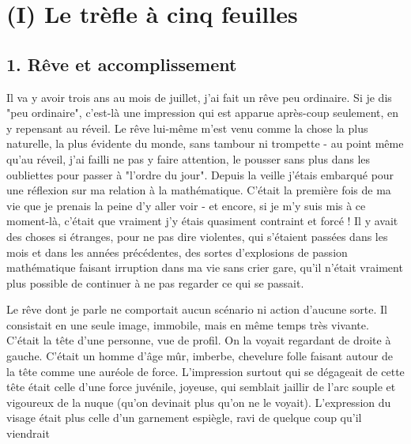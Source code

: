 \section{(I) Le trèfle à cinq feuilles}

\subsection*{1. Rêve et accomplissement}

Il va y avoir trois ans au mois de juillet, j'ai fait un rêve peu ordinaire. Si je dis "peu ordinaire", c'est-là une impression qui est apparue après-coup seulement, en y repensant au réveil. Le rêve lui-même m'est venu comme la chose la plus naturelle, la plus évidente du monde, sans tambour ni trompette - au point même qu'au réveil, j'ai failli ne pas y faire attention, le pousser sans plus dans les oubliettes pour passer à "l'ordre du jour". Depuis la veille j'étais embarqué pour une réflexion sur ma relation à la mathématique. C'était la première fois de ma vie que je prenais la peine d'y aller voir - et encore, si je m'y suis mis à ce moment-là, c'était que vraiment j'y étais quasiment contraint et forcé ! Il y avait des choses si étranges, pour ne pas dire violentes, qui s'étaient passées dans les mois et dans les années précédentes, des sortes d'explosions de passion mathématique faisant irruption dans ma vie sans crier gare, qu'il n'était vraiment plus possible de continuer à ne pas regarder ce qui se passait.

Le rêve dont je parle ne comportait aucun scénario ni action d'aucune sorte. Il consistait en une seule image, immobile, mais en même temps très vivante. C'était la tête d'une personne, vue de profil. On la voyait regardant de droite à gauche. C'était un homme d'âge mûr, imberbe, chevelure folle faisant autour de la tête comme une auréole de force. L'impression surtout qui se dégageait de cette tête était celle d'une force juvénile, joyeuse, qui semblait jaillir de l'arc souple et vigoureux de la nuque (qu'on devinait plus qu'on ne le voyait). L'expression du visage était plus celle d'un garnement espiègle, ravi de quelque coup qu'il viendrait

